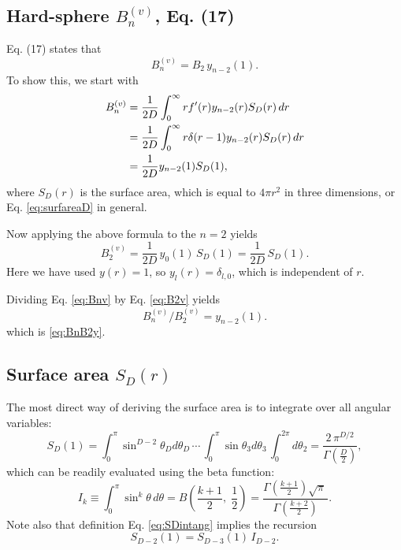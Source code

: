 \documentclass[preprint]{revtex4-1}
\numberwithin{equation}{subsection}
\numberwithin{table}{section}
\begin{document}
\subsection{Hard-sphere $B_n^{(v)}$, Eq. (17)}


Eq. (17) states that
\begin{equation}
  B_n^{(v)} = B_2 \, y_{n-2}(1).
  \tag{17}
  \label{eq:BnB2y}
\end{equation}
%
To show this, we start with
\begin{align}
  B_n^{(v)}
&=
  \frac{1}{2D}
    \int_0^\infty r f'(r) y_{n-2}(r) S_D(r) \, dr
    \notag \\
&=
  \frac{1}{2D}
    \int_0^\infty r \delta(r - 1) y_{n-2}(r) S_D(r) \, dr
    \notag \\
&= \frac{1}{2D}
    y_{n-2}(1) S_D(1),
    \label{eq:Bnv}
\end{align}
%
where $S_D(r)$ is the surface area,
which is equal to $4\pi r^2$ in three dimensions,
or Eq. \eqref{eq:surfareaD} in general.

Now applying the above formula to the $n = 2$ yields
\begin{equation}
B_2^{(v)}
=
\frac{1}{2D} \, y_0(1) \, S_D(1)
=
\frac{1}{2D} \, S_D(1).
\label{eq:B2v}
\end{equation}
Here we have used $y(r) = 1$, so $y_l(r) = \delta_{l, 0}$,
  which is independent of $r$.

Dividing Eq. \eqref{eq:Bnv} by Eq. \eqref{eq:B2v} yields
\[
  B_n^{(v)} / B_2^{(v)} = y_{n-2}(1).
\]
which is \eqref{eq:BnB2y}.



\subsection{Surface area $S_D(r)$}



The most direct way of deriving the surface area
is to integrate over all angular variables:
%
\begin{equation}
  S_{D}(1)
=
\int_0^\pi \sin^{D-2} \theta_D d\theta_D \,
\cdots \,
\int_0^\pi \sin \theta_3 d\theta_3 \,
\int_0^{2\pi} d\theta_2
=
\frac{2 \, \pi^{D/2} } { \Gamma\left( \frac{D} 2 \right) },
\label{eq:SDintang}
\end{equation}
which can be readily evaluated using the beta function:
\begin{equation}
  I_{k}
\equiv
  \int_0^\pi \sin^k \theta \, d\theta
=
B\left(\frac {k + 1} 2, \; \frac 1 2 \right)
=
\frac{
  \Gamma\left( \frac {k+1} 2 \right)
  \sqrt\pi \,
}
{
  \Gamma\left(  \frac {k + 2} 2 \right)
}.
\label{eq:intsink}
\end{equation}
Note also that definition Eq. \eqref{eq:SDintang} implies the recursion
\begin{equation}
  S_{D-2}(1)
=
  S_{D-3}(1) \, I_{D-2}.
\end{equation}
\end{document}
